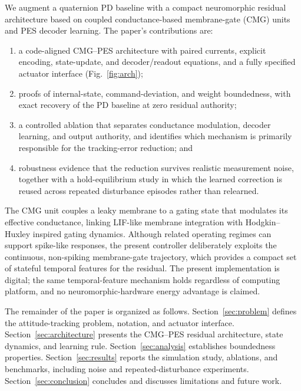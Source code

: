 \documentclass[letterpaper, 10 pt, conference]{ieeeconf}
\begin{document}
We augment a quaternion PD baseline with a compact neuromorphic residual architecture based on coupled conductance-based membrane-gate (CMG) units and PES decoder learning. The paper's contributions are:
\begin{enumerate}
    \item a code-aligned CMG--PES architecture with paired currents, explicit encoding, state-update, and decoder/readout equations, and a fully specified actuator interface (Fig.~\ref{fig:arch});
    \item proofs of internal-state, command-deviation, and weight boundedness, with exact recovery of the PD baseline at zero residual authority;
    \item a controlled ablation that separates conductance modulation, decoder learning, and output authority, and identifies which mechanism is primarily responsible for the tracking-error reduction; and
    \item robustness evidence that the reduction survives realistic measurement noise, together with a hold-equilibrium study in which the learned correction is reused across repeated disturbance episodes rather than relearned.
\end{enumerate}


The CMG unit couples a leaky membrane to a gating state that modulates its effective conductance, linking LIF-like membrane integration with Hodgkin--Huxley inspired gating dynamics. Although related operating regimes can support spike-like responses, the present controller deliberately exploits the continuous, non-spiking membrane-gate trajectory, which provides a compact set of stateful temporal features for the residual.
The present implementation is digital; the same temporal-feature mechanism holds regardless of computing platform, and no neuromorphic-hardware energy advantage is claimed.

The remainder of the paper is organized as follows. Section~\ref{sec:problem} defines the attitude-tracking problem, notation, and actuator interface. Section~\ref{sec:architecture} presents the CMG--PES residual architecture, state dynamics, and learning rule. Section~\ref{sec:analysis} establishes boundedness properties. Section~\ref{sec:results} reports the simulation study, ablations, and benchmarks, including noise and repeated-disturbance experiments. Section~\ref{sec:conclusion} concludes and discusses limitations and future work.
\end{document}
